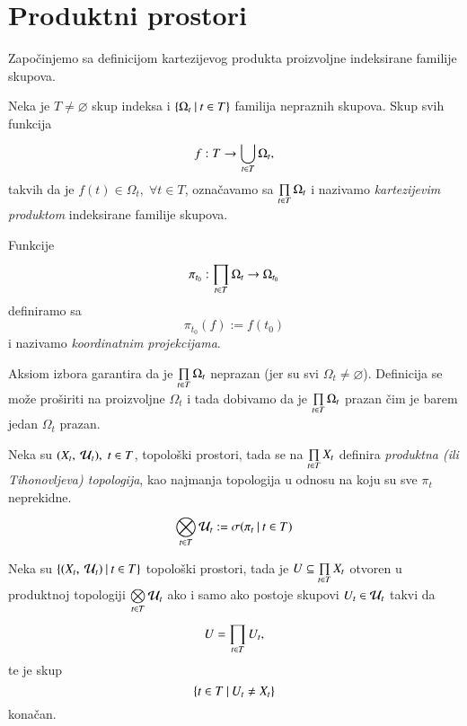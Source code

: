 
\chapter{Produktni prostori}

Zapo\v cinjemo sa definicijom kartezijevog produkta proizvoljne indeksirane familije skupova.
\begin{defn}
    Neka je $T \neq \varnothing$ skup indeksa i $\{{\Omega_t} \: | \: {t \in T}\}$ familija nepraznih skupova.
    Skup svih funkcija
    \begin{equation*}    \label{defn:4.1-1}
        f: T \to \bigcup\limits_{t \in T}^{} \Omega_t,
    \end{equation*}
    takvih da je $f(t) \in \Omega_t, \; \forall t \in T$, ozna\v cavamo sa $\prod\limits_{t \in T}^{} \Omega_t$ i nazivamo \emph{kartezijevim produktom} indeksirane familije skupova.

    Funkcije
    \begin{equation*}
        \pi_{t_0}: \prod\limits_{t \in T}^{} \Omega_t \to \Omega_{t_0}
    \end{equation*}
    definiramo sa
    \begin{equation*}
        \pi_{t_0} (f) := f(t_0)
    \end{equation*}
    i nazivamo \emph{koordinatnim projekcijama}.
\end{defn}


Aksiom izbora garantira da je $\prod\limits_{t \in T}^{} \Omega_t$ neprazan (jer su svi $\Omega_t \neq \varnothing$).
Definicija se mo\v ze pro\v siriti na proizvoljne $\Omega_t$ i tada dobivamo da je $\prod\limits_{t \in T}^{} \Omega_t$ prazan  \v cim je barem jedan $\Omega_t$ prazan.

\begin{defn}    \label{defn:4.0-1}
    Neka su $(X_t, \: \mathcal{U}_t), \; t \in T$, topolo\v ski prostori, tada se na $\prod\limits_{t \in T}^{} X_t$ definira \emph{produktna (ili Tihonovljeva) topologija}, kao najmanja topologija u odnosu na koju su sve $\pi_t$ neprekidne.
    \begin{equation*}
        \bigotimes\limits_{t \in T}^{} \mathcal{U}_t := \sigma({\pi_t} \: | \: {t \in T})
    \end{equation*}
\end{defn}

\begin{tm}  \label{tm:4.0-2}
    Neka su $\{{({X_t}, \: {\mathcal{U}_t})} \: | \: {t \in T}\}$ topolo\v ski prostori, tada je $U \subseteq \prod\limits_{t \in T}^{} X_t$ otvoren u produktnoj topologiji $\bigotimes\limits_{t \in T}^{} \mathcal{U}_t$ ako i samo ako postoje skupovi $U_t \in \mathcal{U}_t$ takvi da
    \begin{equation*}
        U = \prod\limits_{t \in T}^{} U_t,
    \end{equation*}
    te je skup
    \begin{equation*}
        \{{t \in T} \: | \: {U_t \neq X_t}\}
    \end{equation*}
    kona\v can.
\end{tm}

